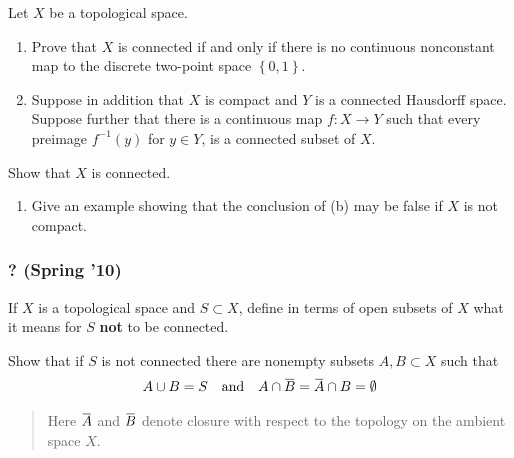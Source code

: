 \begin{problem}[?]

Let \(X\) be a topological space.

\begin{enumerate}
\def\labelenumi{\alph{enumi}.}
\item
  Prove that \(X\) is connected if and only if there is no continuous
  nonconstant map to the discrete two-point space
  \(\left\{{0, 1}\right\}\).
\item
  Suppose in addition that \(X\) is compact and \(Y\) is a connected
  Hausdorff space. Suppose further that there is a continuous map
  \(f : X \to Y\) such that every preimage \(f^{-1}(y)\) for
  \(y \in Y\), is a connected subset of \(X\).
\end{enumerate}

Show that \(X\) is connected.

\begin{enumerate}
\def\labelenumi{\alph{enumi}.}
\setcounter{enumi}{2}
\tightlist
\item
  Give an example showing that the conclusion of (b) may be false if
  \(X\) is not compact.
\end{enumerate}

\end{problem}

\hypertarget{spring-10}{%
\subsubsection{? (Spring '10)}\label{spring-10}}

\begin{problem}[?]

If \(X\) is a topological space and \(S \subset X\), define in terms of
open subsets of \(X\) what it means for \(S\) \textbf{not} to be
connected.

Show that if \(S\) is not connected there are nonempty subsets
\(A, B \subset X\) such that
\begin{align*}
A \cup B = S {\quad \operatorname{and} \quad} A \cap \mkern 1.5mu\overline{\mkern-1.5muB\mkern-1.5mu}\mkern 1.5mu = \mkern 1.5mu\overline{\mkern-1.5muA\mkern-1.5mu}\mkern 1.5mu \cap B = \emptyset
\end{align*}

\begin{quote}
Here \(\mkern 1.5mu\overline{\mkern-1.5muA\mkern-1.5mu}\mkern 1.5mu\)
and \(\mkern 1.5mu\overline{\mkern-1.5muB\mkern-1.5mu}\mkern 1.5mu\)
denote closure with respect to the topology on the ambient space \(X\).
\end{quote}

\end{problem}

